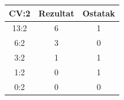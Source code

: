 \begin{tabular}{ccc}\toprule
CV:2 & Rezultat & Ostatak\\\midrule
13:2 &6&1\\6:2&3&0\\3:2&1&1\\
\textcolor{DEcrvena}{1:2}&\textcolor{DEcrvena}{0}&\textcolor{DEcrvena}{1}\\
0:2&0&0\\\bottomrule
\end{tabular}